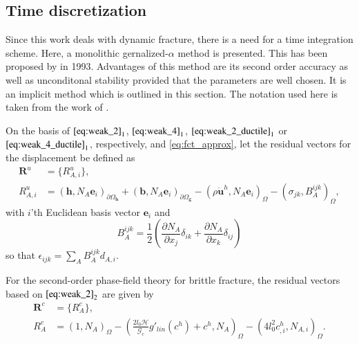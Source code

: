 \subsection{Time discretization} \label{sec:time_discr}
Since this work deals with dynamic fracture, there is a need for a time integration scheme. Here, a monolithic gernalized-$\alpha$ method is presented. This has been proposed by \citet{10_PF_genAlpha} in 1993. Advantages of this method are its second order accuracy as well as unconditonal stability provided that the parameters are well chosen. It is an implicit method which is outlined in this section. The notation used here is taken from the work of \citet{01_PF_dyn_brittle}.

On the basis of $\eqref{eq:weak_2}_{1}$, $\eqref{eq:weak_4}_{1}$, $\eqref{eq:weak_2_ductile}_{1}$ or $\eqref{eq:weak_4_ductile}_{1}$, respectively, and \eqref{eq:fct_approx}, let the residual vectors for the displacement be defined as
\begin{equation} \label{eq:res_vecs_u}
	\begin{aligned}
		\mathbf{R}^{u}&=\{R_{A,i}^{u}\}, \\
		R_{A,i}^{u} &= \left(\mathbf{h},N_{A}\mathbf{e}_{i}\right)_{\partial\Omega_{\mathbf{h}}} + \left(\mathbf{b},N_{A}\mathbf{e}_{i}\right)_{\partial\Omega_{\mathbf{g}}} - \left(\rho\ddot{\mathbf{u}}^{h},N_{A}\mathbf{e}_{i}\right)_{\Omega}-\left(\sigma_{jk},B_{A}^{ijk}\right)_{\Omega},
	\end{aligned}
\end{equation}
with $i$'th Euclidean basis vector $\mathbf{e}_{i}$ and
\begin{equation}
	B_{A}^{ijk}=\frac{1}{2}\left(\frac{\partial N_{A}}{\partial x_{j}}\delta_{ik}+\frac{\partial N_{A}}{\partial x_{k}}\delta_{ij}\right)
\end{equation}
so that $\epsilon_{ijk}=\sum_{A}B_{A}^{ijk}d_{A,i}$.

For the second-order phase-field theory for brittle fracture, the residual vectors based on $\eqref{eq:weak_2}_{2}$ are given by
\begin{equation} \label{eq:res_vecs_c2}
	\begin{aligned}
		\mathbf{R}^{c}&=\{R_{A}^{c}\}, \\
		R_{A}^{c} &= \left(1,N_{A}\right)_{\Omega} - \left(\frac{2l_{0}\mathcal{H}}{\mathcal{G}_{c}}g'_{lin}\left(c^{h}\right) + c^{h},N_{A}\right)_{\Omega} - \left(4l_{0}^{2}c^{h}_{,i},N_{A,i}\right)_{\Omega}.
	\end{aligned}
\end{equation}


